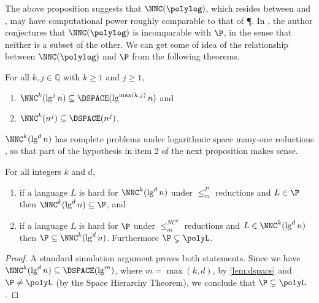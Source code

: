 \documentclass[]{article}
\begin{document}
The above proposition suggests that $\NNC(\polylog)$, which resides between \NC{} and \NP, may have computational power roughly comparable to that of \P.
In \cite{wolf94}, the author conjectures that $\NNC(\polylog)$ is incomparable with $\P$, in the sense that neither is a subset of the other.
We can get some of idea of the relationship between $\NNC(\polylog)$ and $\P$ from the following theorems.

\begin{lemma}\label{lem:dspace}
  For all $k, j \in \mathbb{Q}$ with $k \geq 1$ and $j \geq 1$,
  \begin{enumerate}
  \item $\NNC^k(\lg^j n) \subseteq \DSPACE(\lg^{\max(k, j)} n)$ and
  \item $\NNC^k(n^j) \subseteq \DSPACE(n^j)$.
  \end{enumerate}
\end{lemma}

$\NNC^k(\lg^d n)$ has complete problems under logarithmic space many-one reductions \cite[Theorem~3.6]{cc97}, so that part of the hypothesis in item 2 of the next proposition makes sense.

\begin{proposition}
  For all integers $k$ and $d$,
  \begin{enumerate}
  \item if a language $L$ is hard for $\NNC^k(\lg^d n)$ under $\leq_m^P$ reductions and $L \in \P$ then $\NNC^k(\lg^d n) \subseteq \P$, and
  \item if a language $L$ is hard for $\P$ under $\leq_m^{NC^k}$ reductions and $L \in \NNC^k(\lg^d n)$ then $\P \subseteq \NNC^k(\lg^d n)$.
    Furthermore $\P \subsetneq \polyL$.
  \end{enumerate}
\end{proposition}
\begin{proof}
  A standard simulation argument proves both statements.
  Since we have $\NNC^k(\lg^d n) \subseteq \DSPACE(\lg^m)$, where $m = \max(k, d)$, by \autoref{lem:dspace} and $\P \neq \polyL$ (by the Space Hierarchy Theorem), we conclude that $\P \subsetneq \polyL$.
\end{proof}
\end{document}
